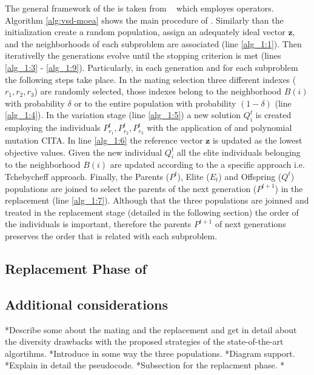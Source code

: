 The general framework of the \VSDMOEAD{} is taken from \MOEADDE{}~\cite{li2009multiobjective} which employes \DE{} operators.
%
Algorithm \ref{alg:vsd-moea} shows the main procedure of \VSDMOEAD{}.
%
Similarly than \MOEADDE{} the initialization create a random population, assign an adequately ideal vector $\mathbf{z}$, and the neighborhoods of each subproblem are associated (line \ref{alg_1:1}).
%
Then iterativelly the generations evolve until the stopping criterion is met (lines \ref{alg_1:3} - \ref{alg_1:9}).
%
Particularly, in each generation and for each subproblem the following steps take place.
%
In the mating selection three different indexes ($r_1, r_2, r_3$) are randomly selected, those indexes belong to the neighborhood $B(i)$ with probability $\delta$ or to the entire population with probability $(1 - \delta)$ (line \ref{alg_1:4}).
%
In the variation stage (line \ref{alg_1:5}) a new solution $Q^t_i$ is created employing the individuals $P^t_{r_1}, P^t_{r_2}, P^t_{r_3}$ with the application of \DE{} and polynomial mutation CITA.
%
In line \ref{alg_1:6} the reference vector $\mathbf{z}$ is updated as the lowest objective values. 
%
Given the new individual $Q^t_i$ all the elite individuals belonging to the neighborhood $B(i)$ are updated according to the a specific approach i.e. Tchebycheff approach.
%
Finally, the Parents ($P^t$), Elite ($E_t$) and Offspring ($Q^t$) populations are joined to select the parents of the next generation ($P^{t+1}$)  in the replacement (line \ref{alg_1:7}).
%
Although that the three populations are joinned and treated in the replacement stage (detailed in the following section) the order of the individuals is important, therefore the parents $P^{t+1}$ of next generations preserves the order that is related with each subproblem.
%




\subsection{Replacement Phase of \VSDMOEAD{} }


\subsection{ Additional considerations}


*Describe some about the mating and the replacement and get in detail about the diversity drawbacks with the proposed strategies of the state-of-the-art algortihms.
*Introduce in some way the three populations.
*Diagram support.
*Explain in detail the pseudocode.
*Subsection for the replacment phase.
*

